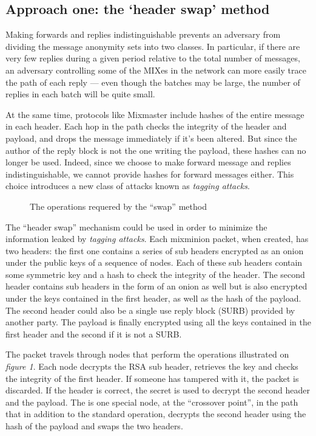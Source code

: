 \documentclass{llncs}
\begin{document}
\subsection{Approach one: the `header swap' method}

Making forwards and replies indistinguishable prevents an adversary from
dividing the message anonymity sets into two classes. In particular, if
there are very few replies during a given period relative to the total
number of messages, an adversary controlling some of the MIXes in the
network can more easily trace the path of each reply --- even though
the batches may be large, the number of replies in each batch will be
quite small.

At the same time, protocols like Mixmaster include hashes of the entire
message in each header. Each hop in the path checks the integrity of
the header and payload, and drops the message immediately if it's been
altered. But since the author of the reply block is not the one writing
the payload, these hashes can no longer be used. Indeed, since we choose
to make forward message and replies indistinguishable, we cannot provide
hashes for forward messages either. This choice introduces a new class
of attacks known as \emph{tagging attacks}.

\begin{figure}
\begin{center}
\caption{The operations requered by the ``swap'' method} 
\end{center}
\end{figure}

The ``header swap'' mechanism could be used in order to minimize the
information leaked by \emph{tagging attacks}. Each mixminion packet,
when created, has two headers: the first one contains a series of sub
headers encrypted as an onion under the public keys of a sequence of
nodes. Each of these sub headers contain some symmetric key and a hash
to check the integrity of the header. The second header contains sub
headers in the form of an onion as well but is also encrypted under
the keys contained in the first header, as well as the hash of the
payload. The second header could also be a single use reply block (SURB)
provided by another party. The payload is finally encrypted using all
the keys contained in the first header and the second if it is not a SURB.

The packet travels through nodes that perform the operations illustrated
on \emph{figure 1}. Each node decrypts the RSA sub header, retrieves
the key and checks the integrity of the first header. If someone has
tampered with it, the packet is discarded. If the header is correct,
the secret is used to decrypt the second header and the payload. The
is one special node, at the ``crossover point'', in the path that in
addition to the standard operation, decrypts the second header using
the hash of the payload and swaps the two headers.
\end{document}
